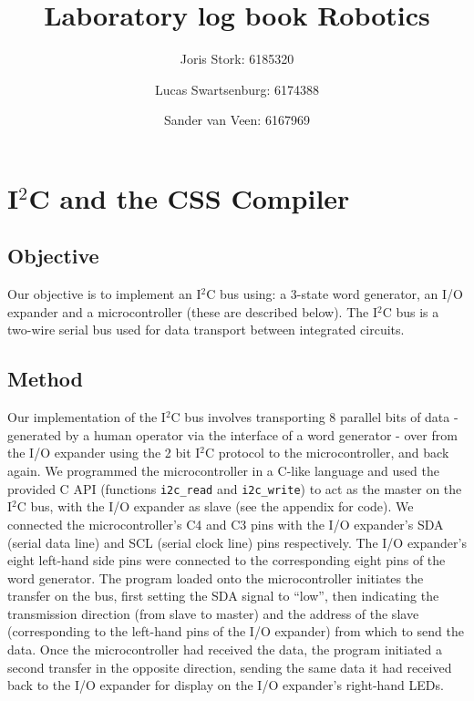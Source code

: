 \documentclass[a4paper, 12pt, titlepage]{article}
\author{Joris Stork: 6185320 \and Lucas Swartsenburg: 6174388 \and Sander van
Veen: 6167969}
\title{Laboratory log book Robotics}
\begin{document}
\maketitle
\tableofcontents 

\newpage

\section{I$^2$C and the CSS Compiler} %

\subsection{Objective} %

Our objective is to implement an I$^2$C bus using: a 3-state word generator, an
I/O expander and a microcontroller (these are described below). 
The I$^2$C bus is a two-wire serial bus used for data transport between
integrated circuits.


\subsection{Method} %
Our implementation of the I$^2$C bus involves transporting 8 parallel bits of data -
generated by a human operator via the interface of a word generator -
over from the I/O expander using the 2 bit I$^2$C protocol to the microcontroller, and
back again. We programmed the
microcontroller in a C-like language and used the provided C API (functions
\texttt{i2c\_read} and \texttt{i2c\_write}) to act as the master on the I$^2$C
bus, with the I/O expander as slave (see the appendix for code). 
We connected the microcontroller's C4 and C3 pins with the I/O expander's
SDA (serial data line) and SCL (serial clock line) pins respectively. The I/O
expander's eight left-hand side pins were connected to the corresponding eight
pins of the word generator.
The program loaded onto the microcontroller initiates the transfer on the bus,
first setting the SDA signal to ``low'', then  
indicating the transmission direction (from slave to master) and the address of
the slave (corresponding to the left-hand pins of the I/O expander) from which
to send the data. Once the microcontroller had received the data, the program
initiated a second transfer in the opposite direction, sending the same data it
had received back to the I/O expander for display on the I/O expander's
right-hand LEDs.

\end{document}
